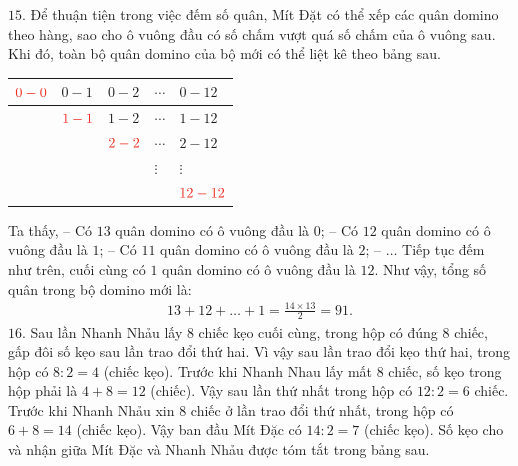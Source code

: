 \vskip 0.1cm
$15.$
Để thuận tiện trong việc đếm số quân, Mít Đặt có thể xếp các quân domino theo hàng, sao cho ô vuông đầu có số chấm vượt quá số chấm của ô vuông sau. Khi đó, toàn bộ quân domino của bộ mới có thể liệt kê theo bảng sau.
\begin{table}[H]
	\centering
	\renewcommand{\arraystretch}{1.3}
	\begin{tabular}{|m{1.5cm}|m{1.5cm}|m{1.5cm}|m{1.5cm}|m{1.5cm}|}
		\hline
		$\color{toanhocdoisong}0-0$ & $0-1$& $0-2$ & $\cdots$ &$0-12$\\
		\hline
		 & $\color{toanhocdoisong}1-1$& $1-2$&$\cdots$& $1-12$\\
		 \hline
		 & & $\color{toanhocdoisong}2-2$&$\cdots$& $2-12$\\
		 \hline
		 & & &$\vdots$& $\vdots$\\
		 \hline
		 & & & & $\color{toanhocdoisong}12-12$\\
		 \hline
	\end{tabular}
\end{table}
Ta thấy,
\vskip 0.1cm
-- Có $13$ quân domino có ô vuông đầu là $0$;
\vskip 0.1cm
-- Có $12$ quân domino có ô vuông đầu là $1$;
\vskip 0.1cm
-- Có $11$ quân domino có ô vuông đầu là $2$;
\vskip 0.1cm
-- $\ldots$
\vskip 0.1cm
Tiếp tục đếm như trên, cuối cùng có $1$ quân domino có ô vuông đầu là $12$.
\vskip 0.1cm
Như vậy, tổng số quân trong bộ domino mới là:
\begin{align*}
	13 + 12 + \ldots + 1 = \frac{14\times13}{2}=91.
\end{align*}
$16.$
Sau lần Nhanh Nhảu lấy $8$ chiếc kẹo cuối cùng, trong hộp có đúng $8$ chiếc, gấp đôi số kẹo sau lần trao đổi thứ hai. Vì vậy sau lần trao đổi kẹo thứ hai, trong hộp có $8:2=4$ (chiếc kẹo). Trước khi Nhanh Nhau lấy mất $8$ chiếc, số kẹo trong hộp phải là $4+8 = 12$ (chiếc). Vậy sau lần
thứ nhất trong hộp có $12:2 = 6$ chiếc. Trước khi Nhanh Nhảu xin $8$ chiếc ở lần trao đổi thứ nhất, trong hộp có $6+8=14$ (chiếc kẹo). Vậy ban đầu Mít Đặc có $14:2=7$ (chiếc kẹo).
\vskip 0.1cm
Số kẹo cho và nhận giữa Mít Đặc và Nhanh Nhảu được tóm tắt trong bảng sau.
\begin{table}[H]
	\centering
	\renewcommand{\arraystretch}{1.3}
\end{table}
